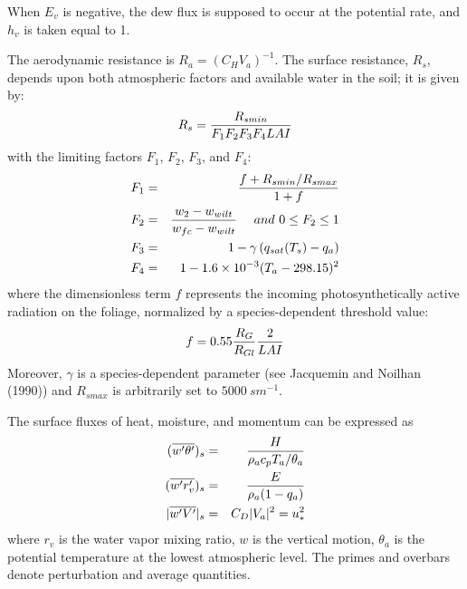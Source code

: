 %
When $E_v$ is negative, the dew flux is supposed to occur
at the potential rate, and $h_v$ is taken equal to 1.
%


The aerodynamic resistance is $R_a = ( C_H V_a )^{-1}$.
The surface resistance, $R_s$, depends upon both atmospheric
factors and available water in the soil; it is given by:
\begin{eqnarray}
R_s = {R_{smin} \over F_1 F_2 F_3 F_4 LAI}
\end{eqnarray}
with the limiting factors $F_1$, $F_2$, $F_3$, and $F_4$:
\begin{eqnarray}
F_1 &=& {f+R_{smin}/R_{smax} \over 1+f} \\
F_2 &=& {w_2-w_{wilt} \over w_{fc} - w_{wilt} } \ \ \ \
and \ 0 \leq F_2 \leq 1 \\
F_3 &=& 1 - \gamma \left( q_{sat}(T_s) - q_a \right) \\
F_4 &=& 1-1.6\times 10^{-3} (T_a - 298.15)^2
\end{eqnarray}
where the dimensionless term $f$ represents the incoming
photosynthetically active radiation on the foliage,
normalized by a species-dependent threshold value:
\begin{eqnarray}
f = 0.55 {R_G \over R_{Gl}} {2 \over LAI}
\end{eqnarray}
Moreover,
$\gamma$ is a species-dependent parameter (see Jacquemin and Noilhan (1990)\nocite{Jacquemin1990}) and $R_{smax}$ is arbitrarily set to $5000 \ s m^{-1}$.

The surface fluxes of heat, moisture, and momentum can
be expressed as
\begin{eqnarray}
(\overline{w'\theta'})_s &=& {H \over \rho_a c_p T_a / \theta_a} \label{eqn_H} \\
(\overline{w'r'_v})_s &=& {E \over \rho_a (1-q_a)} \label{eqn_LE} \\
|\overline{w'V'}|_s &=& C_D |V_a|^2  = u^2_* \label{eqn_FM}
\end{eqnarray}
where $r_v$ is the water vapor mixing ratio,
$w$ is the vertical motion, $\theta_a$ is the potential
temperature at the lowest atmospheric level.  The primes and
overbars denote perturbation and average quantities.

